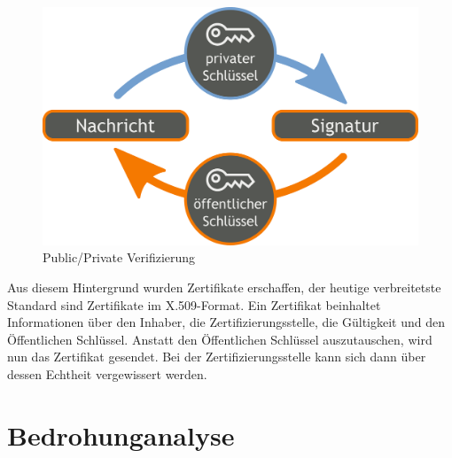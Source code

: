 \documentclass[11pt,a4paper]{report}
\begin{document}
\begin{figure}[htbp]
\centering
\includegraphics[scale=0.2]{images/public_private_verification.pdf}
\caption{Public/Private Verifizierung \cite{wiki_asym_crypto}}
\label{fig:pp_veri}
\end{figure}

Aus diesem Hintergrund wurden Zertifikate erschaffen, der heutige verbreitetste Standard sind Zertifikate im X.509-Format. Ein Zertifikat beinhaltet Informationen über den Inhaber, die Zertifizierungsstelle, die Gültigkeit und den Öffentlichen Schlüssel. Anstatt den Öffentlichen Schlüssel auszutauschen, wird nun das Zertifikat gesendet. Bei der Zertifizierungsstelle kann sich dann über dessen Echtheit vergewissert werden. 

\chapter{Bedrohunganalyse} \label{chap:threat_analysis}
\end{document}
